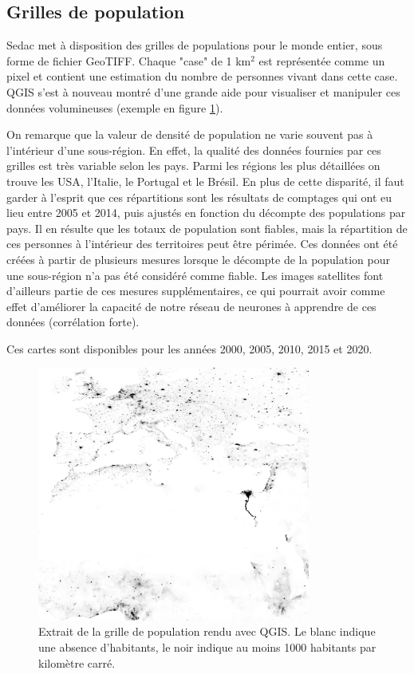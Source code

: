 \documentclass[a4paper, 11pt]{report}
\begin{document}
\subsection{Grilles de population}
Sedac \cite{sedac} met à disposition des grilles de populations pour le monde entier, sous forme de fichier GeoTIFF. Chaque "case" de 1 km$^2$ est représentée comme un pixel et contient une estimation du nombre de personnes vivant dans cette case. QGIS s'est à nouveau montré d'une grande aide pour visualiser et manipuler ces données volumineuses (exemple en figure \ref{qgis-sedac}).

On remarque que la valeur de densité de population ne varie souvent pas à l'intérieur d'une sous-région. En effet, la qualité des données fournies par ces grilles est très variable selon les pays. Parmi les régions les plus détaillées on trouve les USA, l'Italie, le Portugal et le Brésil. En plus de cette disparité, il faut garder à l'esprit que ces répartitions sont les résultats de comptages qui ont eu lieu entre 2005 et 2014, puis ajustés en fonction du décompte des populations par pays. Il en résulte que les totaux de population sont fiables, mais la répartition de ces personnes à l'intérieur des territoires peut être périmée.
Ces données ont été créées à partir de plusieurs mesures lorsque le décompte de la population pour une sous-région n'a pas été considéré comme fiable. Les images satellites font d'ailleurs partie de ces mesures supplémentaires, ce qui pourrait avoir comme effet d'améliorer la capacité de notre réseau de neurones à apprendre de ces données (corrélation forte).

Ces cartes sont disponibles pour les années 2000, 2005, 2010, 2015 et 2020.

\begin{figure}[h]
	\centering
	\includegraphics[width=0.8\textwidth]{img/pop_subset.png}
	\caption{Extrait de la grille de population \cite{sedac} rendu avec QGIS. Le blanc indique une absence d'habitants, le noir indique au moins 1000 habitants par kilomètre carré.}
	\label{qgis-sedac}
\end{figure}
\end{document}
